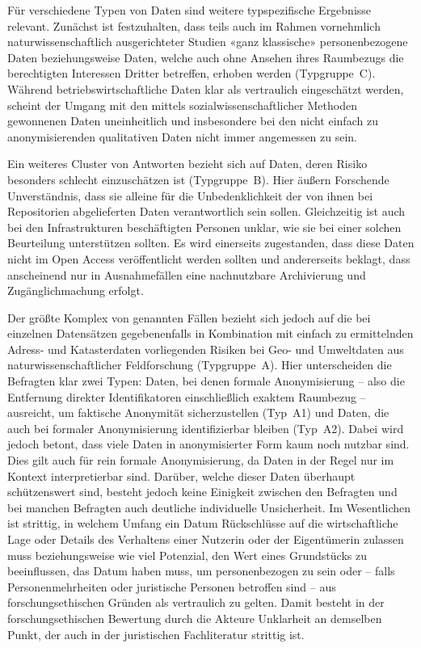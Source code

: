 \documentclass[a4paper,
fontsize=11pt,
oneside,
numbers=noperiodatend,
parskip=half-,
bibliography=totoc,
final
]{scrartcl}
\begin{document}
Für verschiedene Typen von Daten sind weitere typspezifische Ergebnisse
relevant. Zunächst ist festzuhalten, dass teils auch im Rahmen
vornehmlich naturwissenschaftlich ausgerichteter Studien «ganz
klassische» personenbezogene Daten beziehungsweise Daten, welche auch
ohne Ansehen ihres Raumbezugs die berechtigten Interessen Dritter
betreffen, erhoben werden (Typgruppe~C). Während betriebswirtschaftliche
Daten klar als vertraulich eingeschätzt werden, scheint der Umgang mit
den mittels sozialwissenschaftlicher Methoden gewonnenen Daten
uneinheitlich und insbesondere bei den nicht einfach zu anonymisierenden
qualitativen Daten nicht immer angemessen zu sein.

Ein weiteres Cluster von Antworten bezieht sich auf Daten, deren Risiko
besonders schlecht einzuschätzen ist (Typgruppe~B). Hier äußern
Forschende Unverständnis, dass sie alleine für die Unbedenklichkeit der
von ihnen bei Repositorien abgelieferten Daten verantwortlich sein
sollen. Gleichzeitig ist auch bei den Infrastrukturen beschäftigten
Personen unklar, wie sie bei einer solchen Beurteilung unterstützen
sollten. Es wird einerseits zugestanden, dass diese Daten nicht im Open
Access veröffentlicht werden sollten und andererseits beklagt, dass
anscheinend nur in Ausnahmefällen eine nachnutzbare Archivierung und
Zugänglichmachung erfolgt.

Der größte Komplex von genannten Fällen bezieht sich jedoch auf die bei
einzelnen Datensätzen gegebenenfalls in Kombination mit einfach zu
ermittelnden Adress- und Katasterdaten vorliegenden Risiken bei Geo- und
Umweltdaten aus naturwissenschaftlicher Feldforschung (Typgruppe~A).
Hier unterscheiden die Befragten klar zwei Typen: Daten, bei denen
formale Anonymisierung -- also die Entfernung direkter Identifikatoren
einschließlich exaktem Raumbezug -- ausreicht, um faktische Anonymität
sicherzustellen (Typ~A1) und Daten, die auch bei formaler Anonymisierung
identifizierbar bleiben (Typ~A2). Dabei wird jedoch betont, dass viele
Daten in anonymisierter Form kaum noch nutzbar sind. Dies gilt auch für
rein formale Anonymisierung, da Daten in der Regel nur im Kontext
interpretierbar sind. Darüber, welche dieser Daten überhaupt
schützenswert sind, besteht jedoch keine Einigkeit zwischen den
Befragten und bei manchen Befragten auch deutliche individuelle
Unsicherheit. Im Wesentlichen ist strittig, in welchem Umfang ein Datum
Rückschlüsse auf die wirtschaftliche Lage oder Details des Verhaltens
einer Nutzerin oder der Eigentümerin zulassen muss beziehungsweise wie
viel Potenzial, den Wert eines Grundstücks zu beeinflussen, das Datum
haben muss, um personenbezogen zu sein oder -- falls Personenmehrheiten
oder juristische Personen betroffen sind -- aus forschungsethischen
Gründen als vertraulich zu gelten. Damit besteht in der
forschungsethischen Bewertung durch die Akteure Unklarheit an demselben
Punkt, der auch in der juristischen Fachliteratur strittig ist.
\end{document}
